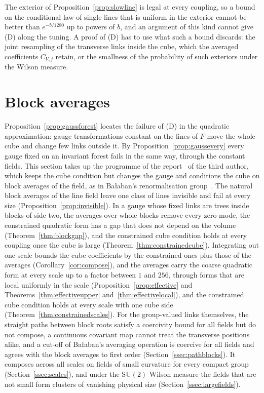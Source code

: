 \documentclass[11pt]{amsart}
\theoremstyle{definition}
\theoremstyle{remark}
\numberwithin{equation}{section}
\newcommand{\SU}{\mathrm{SU}}
\begin{document}
The exterior of Proposition~\ref{prop:slowline} is legal at every coupling,
so a bound on the conditional law of single lines that is uniform in the
exterior cannot be better than $e^{-b/1280}$ up to powers of $b$, and an
argument of this kind cannot give (D) along the tuning. A proof of (D) has to
use what such a bound discards: the joint resampling of the transverse links
inside the cube, which the averaged coefficients $C_{V,j}$ retain, or the
smallness of the probability of such exteriors under the Wilson measure.

\section{Block averages}\label{sec:blocks}

Proposition~\ref{prop:gaussforest} locates the failure of (D) in the
quadratic approximation: gauge transformations constant on the lines of $F$
move the whole cube and change few links outside it. By
Proposition~\ref{prop:gaussevery} every gauge fixed on an invariant forest
fails in the same way, through the constant fields. This section takes
up the programme of the report~\cite{Loc26} of the third author, which keeps
the cube condition but changes the gauge and conditions the cube on block
averages of the field, as in Ba{\l}aban's renormalisation
group~\cite{Bal84a,Bal85a}. The natural block averages of the line field
leave one class of lines invisible and fail at every size
(Proposition~\ref{prop:invisible}). In a gauge whose fixed links are trees
inside blocks of side two, the averages over whole blocks remove every zero
mode, the constrained quadratic form has a gap that does not depend on the
volume (Theorem~\ref{thm:blockgap}), and the constrained cube condition holds
at every coupling once the cube is large (Theorem~\ref{thm:constrainedcube}).
Integrating out one scale bounds the cube coefficients by the constrained
ones plus those of the averages (Corollary~\ref{cor:compose}), and the
averages carry the coarse quadratic form at every scale up to a factor
between $1$ and $256$, through forms that are local uniformly in the scale
(Proposition~\ref{prop:effective} and Theorems~\ref{thm:effectiveupper}
and~\ref{thm:effectivelocal}), and the constrained cube condition holds at
every scale with one cube side (Theorem~\ref{thm:constrainedscales}). For the group-valued links themselves,
the straight paths between block roots satisfy a coercivity bound for all
fields but do not compose, a continuous covariant map cannot treat the
transverse positions alike, and a cut-off of Ba{\l}aban's averaging operation
is coercive for all fields and agrees with the block averages to first
order (Section~\ref{ssec:pathblocks}). It composes across all scales on fields
of small curvature for every compact group (Section~\ref{ssec:scales}), and
under the $\SU(2)$ Wilson measure the fields that are not small form
clusters of vanishing physical size (Section~\ref{ssec:largefields}).
\end{document}
